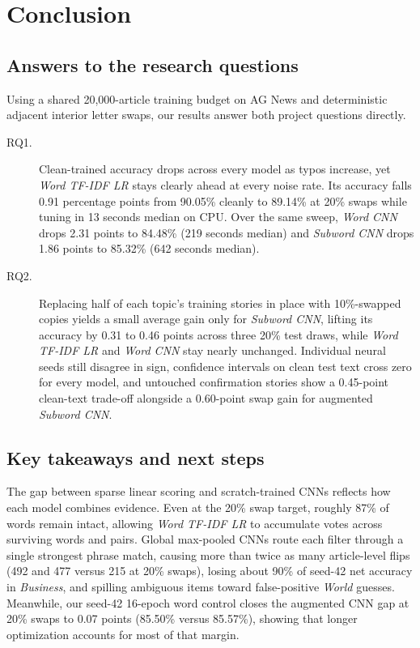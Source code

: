 \chapter{Conclusion}\label{ch:conclusion}

\section{Answers to the research questions}
Using a shared 20,000-article training budget on AG News and deterministic adjacent interior letter swaps, our results answer both project questions directly.

\begin{description}
\item[RQ1.] Clean-trained accuracy drops across every model as typos increase, yet \textit{Word TF-IDF LR} stays clearly ahead at every noise rate. Its accuracy falls 0.91 percentage points from 90.05\% cleanly to 89.14\% at 20\% swaps while tuning in 13 seconds median on CPU. Over the same sweep, \textit{Word CNN} drops 2.31 points to 84.48\% (219 seconds median) and \textit{Subword CNN} drops 1.86 points to 85.32\% (642 seconds median).
\item[RQ2.] Replacing half of each topic's training stories in place with 10\%-swapped copies yields a small average gain only for \textit{Subword CNN}, lifting its accuracy by 0.31 to 0.46 points across three 20\% test draws, while \textit{Word TF-IDF LR} and \textit{Word CNN} stay nearly unchanged. Individual neural seeds still disagree in sign, confidence intervals on clean test text cross zero for every model, and untouched confirmation stories show a 0.45-point clean-text trade-off alongside a 0.60-point swap gain for augmented \textit{Subword CNN}.
\end{description}

\section{Key takeaways and next steps}
The gap between sparse linear scoring and scratch-trained CNNs reflects how each model combines evidence. Even at the 20\% swap target, roughly 87\% of words remain intact, allowing \textit{Word TF-IDF LR} to accumulate votes across surviving words and pairs. Global max-pooled CNNs route each filter through a single strongest phrase match, causing more than twice as many article-level flips (492 and 477 versus 215 at 20\% swaps), losing about 90\% of seed-42 net accuracy in \emph{Business}, and spilling ambiguous items toward false-positive \emph{World} guesses. Meanwhile, our seed-42 16-epoch word control closes the augmented CNN gap at 20\% swaps to 0.07 points (85.50\% versus 85.57\%), showing that longer optimization accounts for most of that margin.

